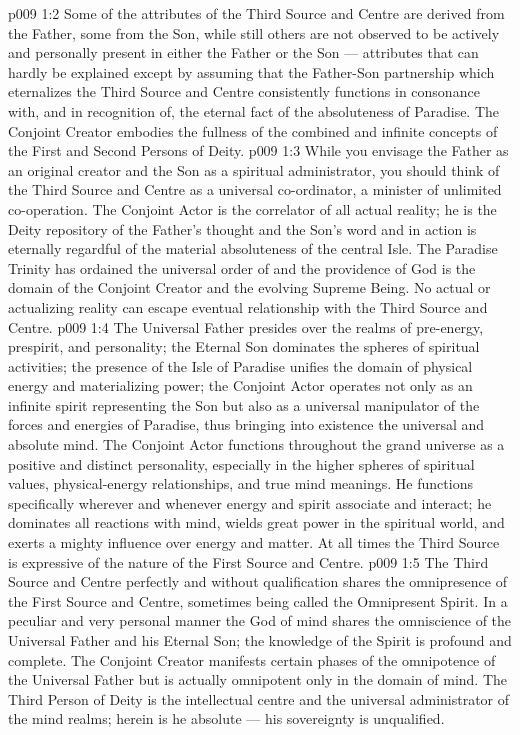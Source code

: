 \vs p009 1:2 Some of the attributes of the Third Source and Centre are derived from the Father, some from the Son, while still others are not observed to be actively and personally present in either the Father or the Son --- attributes that can hardly be explained except by assuming that the Father\hyp{}Son partnership which eternalizes the Third Source and Centre consistently functions in consonance with, and in recognition of, the eternal fact of the absoluteness of Paradise. The Conjoint Creator embodies the fullness of the combined and infinite concepts of the First and Second Persons of Deity.
\vs p009 1:3 \pc While you envisage the Father as an original creator and the Son as a spiritual administrator, you should think of the Third Source and Centre as a universal co\hyp{}ordinator, a minister of unlimited co\hyp{}operation. The Conjoint Actor is the correlator of all actual reality; he is the Deity repository of the Father’s thought and the Son’s word and in action is eternally regardful of the material absoluteness of the central Isle. The Paradise Trinity has ordained the universal order of  and the providence of God is the domain of the Conjoint Creator and the evolving Supreme Being. No actual or actualizing reality can escape eventual relationship with the Third Source and Centre.
\vs p009 1:4 \pc The Universal Father presides over the realms of pre\hyp{}energy, prespirit, and personality; the Eternal Son dominates the spheres of spiritual activities; the presence of the Isle of Paradise unifies the domain of physical energy and materializing power; the Conjoint Actor operates not only as an infinite spirit representing the Son but also as a universal manipulator of the forces and energies of Paradise, thus bringing into existence the universal and absolute mind. The Conjoint Actor functions throughout the grand universe as a positive and distinct personality, especially in the higher spheres of spiritual values, physical\hyp{}energy relationships, and true mind meanings. He functions specifically wherever and whenever energy and spirit associate and interact; he dominates all reactions with mind, wields great power in the spiritual world, and exerts a mighty influence over energy and matter. At all times the Third Source is expressive of the nature of the First Source and Centre.
\vs p009 1:5 \pc The Third Source and Centre perfectly and without qualification shares the omnipresence of the First Source and Centre, sometimes being called the Omnipresent Spirit. In a peculiar and very personal manner the God of mind shares the omniscience of the Universal Father and his Eternal Son; the knowledge of the Spirit is profound and complete. The Conjoint Creator manifests certain phases of the omnipotence of the Universal Father but is actually omnipotent only in the domain of mind. The Third Person of Deity is the intellectual centre and the universal administrator of the mind realms; herein is he absolute --- his sovereignty is unqualified.
